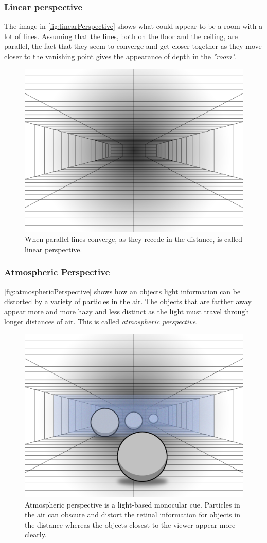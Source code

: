 \subsubsection{Linear perspective}
The image in \autoref{fig:linearPerspective} shows what could appear to be a room with a lot of lines. Assuming that the lines, both on the floor and the ceiling, are parallel, the fact that they seem to converge and get closer together as they move closer to the vanishing point gives the appearance of depth in the \textit{"room"}\citep[p.~201]{sensationPerception}.
\begin{figure}[H]
	\centering
	\includegraphics[width=0.6\linewidth]{figure/Analysis/linearPerspective.png}
	\caption{When parallel lines converge, as they recede in the distance, is called linear perspective.}
	\label{fig:linearPerspective}
\end{figure}

\subsubsection{Atmospheric Perspective}
\autoref{fig:atmosphericPerspective} shows how an objects light information can be distorted by a variety of particles in the air. The objects that are farther away appear more and more hazy and less distinct as the light must travel through longer distances of air. This is called \textit{atmospheric perspective}\citep[p.~202]{sensationPerception}.
\begin{figure}[H]
	\centering
	\includegraphics[width=0.6\linewidth]{figure/Analysis/atmosphericPerspective2.png}
	\caption{Atmospheric perspective is a light-based monocular cue. Particles in the air can obscure and distort the retinal information for objects in the distance whereas the objects closest to the viewer appear more clearly.}
	\label{fig:atmosphericPerspective}
\end{figure}

